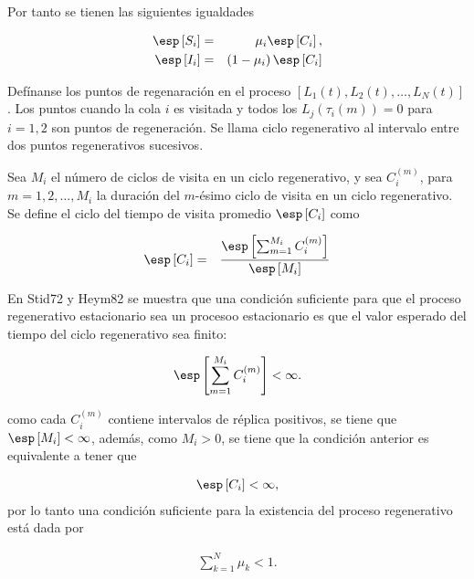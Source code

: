 Por tanto se tienen las siguientes igualdades


\begin{eqnarray*}
\esp\left[S_{i}\right]&=&\mu_{i}\esp\left[C_{i}\right],\\
\esp\left[I_{i}\right]&=&\left(1-\mu_{i}\right)\esp\left[C_{i}\right]\\
\end{eqnarray*}

Def\'inanse los puntos de regenaraci\'on  en el proceso $\left[L_{1}\left(t\right),L_{2}\left(t\right),\ldots,L_{N}\left(t\right)\right]$. Los puntos cuando la cola $i$ es visitada y todos los $L_{j}\left(\tau_{i}\left(m\right)\right)=0$ para $i=1,2$  son puntos de regeneraci\'on. Se llama ciclo regenerativo al intervalo entre dos puntos regenerativos sucesivos.

Sea $M_{i}$  el n\'umero de ciclos de visita en un ciclo regenerativo, y sea $C_{i}^{(m)}$, para $m=1,2,\ldots,M_{i}$ la duraci\'on del $m$-\'esimo ciclo de visita en un ciclo regenerativo. Se define el ciclo del tiempo de visita promedio $\esp\left[C_{i}\right]$ como

\begin{eqnarray*}
\esp\left[C_{i}\right]&=&\frac{\esp\left[\sum_{m=1}^{M_{i}}C_{i}^{(m)}\right]}{\esp\left[M_{i}\right]}
\end{eqnarray*}


En Stid72 y Heym82 se muestra que una condici\'on suficiente para que el proceso regenerativo 
estacionario sea un procesoo estacionario es que el valor esperado del tiempo del ciclo regenerativo sea finito:

\begin{eqnarray*}
\esp\left[\sum_{m=1}^{M_{i}}C_{i}^{(m)}\right]<\infty.
\end{eqnarray*}

como cada $C_{i}^{(m)}$ contiene intervalos de r\'eplica positivos, se tiene que $\esp\left[M_{i}\right]<\infty$, adem\'as, como $M_{i}>0$, se tiene que la condici\'on anterior es equivalente a tener que 

\begin{eqnarray*}
\esp\left[C_{i}\right]<\infty,
\end{eqnarray*}
por lo tanto una condici\'on suficiente para la existencia del proceso regenerativo est\'a dada por

\begin{eqnarray*}
\sum_{k=1}^{N}\mu_{k}<1.
\end{eqnarray*}



